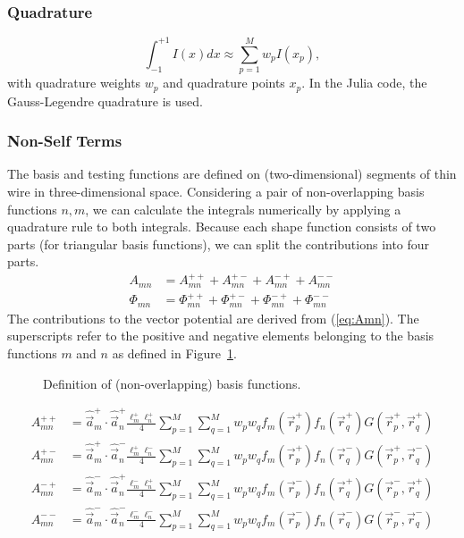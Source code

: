 \subsubsection{Quadrature}

\begin{equation}
	\int_{-1}^{+1} I(x) dx \approx \sum_{p = 1}^{M} w_p I(x_p),
\end{equation}
with quadrature weights $w_p$ and quadrature points $x_p$. In the Julia code, the Gauss-Legendre quadrature is used.

\subsubsection{Non-Self Terms}
The basis and testing functions are defined on (two-dimensional) segments of thin wire in three-dimensional space. Considering a pair of non-overlapping basis functions $n,m$, we can calculate the integrals numerically by applying a quadrature rule to both integrals. Because each shape function consists of two parts (for triangular basis functions), we can split the contributions into four parts.
\begin{align}
	A_{mn} & = A_{mn}^{++} + A_{mn}^{+-} + A_{mn}^{-+} + A_{mn}^{--} \label{eq:amn_nodal} \\
	\Phi_{mn} & = \Phi_{mn}^{++} + \Phi_{mn}^{+-} + \Phi_{mn}^{-+} + \Phi_{mn}^{--} \label{eq:pmn_nodal}
\end{align}
The contributions to the vector potential are derived from (\ref{eq:Amn}). The superscripts refer to the positive and negative elements belonging to the basis functions $m$ and $n$ as defined in Figure~\ref{fig:mom_basis2}.
\begin{figure}[b]
	\centering
	
	\caption{Definition of (non-overlapping) basis functions.}
	\label{fig:mom_basis2}
\end{figure}
\begin{align*}
	A_{mn}^{++} & = \hat{\vec{a}}_m^{+} \cdot \hat{\vec{a}}_n^{+} \frac{\ell_m^{+} \ell_n^{+}}{4} \sum_{p = 1}^M \sum_{q = 1}^M w_p w_q f_m(\vec{r}_p^{+}) f_n(\vec{r}_q^{+}) G(\vec{r}_p^{+}, \vec{r}_q^{+}) \\
	A_{mn}^{+-} & = \hat{\vec{a}}_m^{+} \cdot \hat{\vec{a}}_n^{-} \frac{\ell_m^{+} \ell_n^{-}}{4} \sum_{p = 1}^M \sum_{q = 1}^M w_p w_q f_m(\vec{r}_p^{+}) f_n(\vec{r}_q^{-}) G(\vec{r}_p^{+}, \vec{r}_q^{-}) \\
	A_{mn}^{-+} & = \hat{\vec{a}}_m^{-} \cdot \hat{\vec{a}}_n^{+} \frac{\ell_m^{-} \ell_n^{+}}{4} \sum_{p = 1}^M \sum_{q = 1}^M w_p w_q f_m(\vec{r}_p^{-}) f_n(\vec{r}_q^{+}) G(\vec{r}_p^{-}, \vec{r}_q^{+}) \\
	A_{mn}^{--} & = \hat{\vec{a}}_m^{-} \cdot \hat{\vec{a}}_n^{-} \frac{\ell_m^{-} \ell_n^{-}}{4} \sum_{p = 1}^M \sum_{q = 1}^M w_p w_q f_m(\vec{r}_p^{-}) f_n(\vec{r}_q^{-}) G(\vec{r}_p^{-}, \vec{r}_q^{-})
\end{align*}
